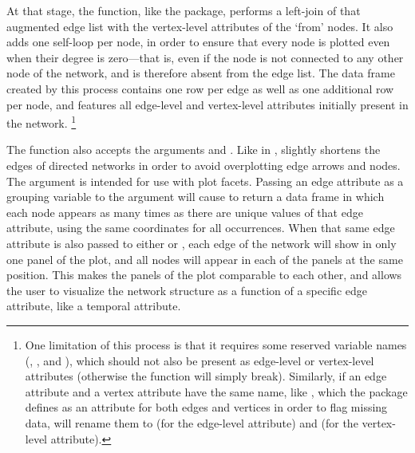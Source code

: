At that stage, the  function, like the  package, performs a left-join of that augmented edge list with the vertex-level attributes of the %
`from' nodes. It also adds one self-loop per node, in order to ensure that every node is plotted even when their degree is zero---that is, even if the node is not connected to any other node of the network, and is therefore absent from the edge list. The data frame created by this process contains one row per edge as well as one additional row per node, and features all edge-level and vertex-level attributes initially present in the network.%
\footnote{One limitation of this process is that it requires some reserved variable names (, ,  and ), which should not also be present as edge-level or vertex-level attributes (otherwise the function will simply break). Similarly, if an edge attribute and a vertex attribute have the same name, like  , which the  package defines as an attribute for both edges and vertices in order to flag missing data,  will rename them to  (for the edge-level attribute) and  (for the vertex-level attribute).} 

The  function also accepts the arguments  and . Like in ,  slightly shortens the edges of directed networks in order to avoid overplotting edge arrows and nodes. The argument  is intended for use with plot facets. Passing an edge attribute as a grouping variable to the  argument will cause  to return a data frame in which each node appears as many times as there are unique values of that edge attribute, using the same coordinates for all occurrences. When that same edge attribute is also passed to either  or , each edge of the network will show in only one panel of the plot, and all nodes will appear in each of the panels at the same position. This makes the panels of the plot comparable to each other, and allows the user to visualize the network structure as a function of a specific edge attribute, like a temporal attribute.

